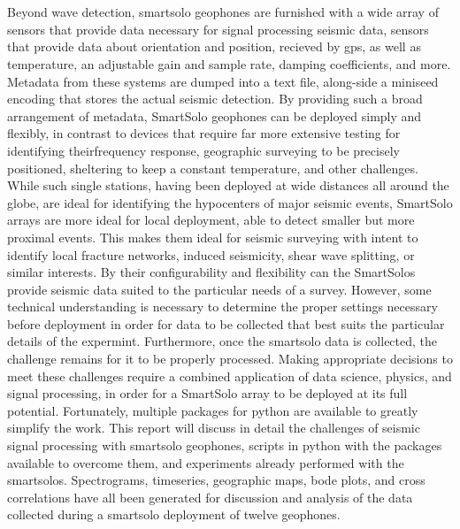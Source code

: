 \section*{}
Beyond wave detection, smartsolo geophones are furnished with a wide array of 
sensors that provide data necessary for signal processing seismic data, 
sensors that provide data about orientation and position, recieved by gps, 
as well as temperature, an adjustable gain and sample rate, 
damping coefficients, and more. Metadata from these systems are dumped into a text file, 
along-side a miniseed encoding that stores the actual seismic detection. 
By providing such a broad arrangement of metadata, SmartSolo geophones can be deployed 
simply and flexibly, in contrast to devices that require far more extensive testing for identifying theirfrequency response, geographic surveying 
to be precisely positioned, sheltering to keep a constant temperature, and other challenges. While such single stations, having been deployed at wide distances all around the globe,
are ideal for identifying the hypocenters of major seismic events, SmartSolo arrays are more ideal for local deployment, able to detect smaller but more proximal events.
This makes them ideal for seismic surveying with intent to identify local fracture networks, induced seismicity, shear wave splitting, or similar interests.
By their configurability and flexibility can the SmartSolos provide seismic data suited to the particular needs of a survey. 
 However, some technical understanding is necessary to determine the proper settings necessary before deployment in order for data to be collected that best suits 
 the particular details of the expermint. 
Furthermore, once  the smartsolo data is collected, the challenge remains for it to be properly processed. Making appropriate decisions to meet these challenges require a combined application of data science, physics, and signal processing,
in order for a SmartSolo array to be deployed at its full potential.  
Fortunately, multiple packages for python are available to greatly simplify the work.  This report will discuss in detail the challenges of 
seismic signal processing with smartsolo geophones, scripts in python with the packages available to overcome them, and experiments already performed with the smartsolos.
 Spectrograms, timeseries, geographic maps, bode plots, and cross correlations
have all been generated for discussion and analysis of the data collected during a smartsolo deployment of twelve geophones. 

